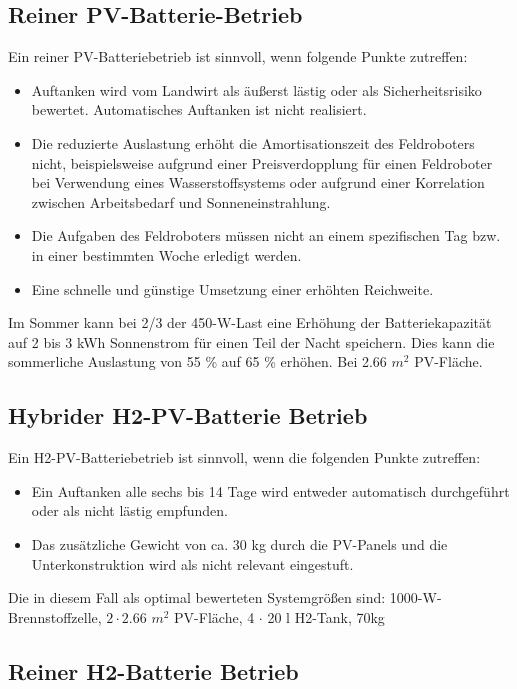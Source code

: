 \subsection{Reiner PV-Batterie-Betrieb}

Ein reiner PV-Batteriebetrieb ist sinnvoll, wenn folgende Punkte zutreffen: 
\begin{itemize}
    \item Auftanken wird vom Landwirt als äußerst lästig oder als Sicherheitsrisiko bewertet. Automatisches Auftanken ist nicht realisiert.
    \item Die reduzierte Auslastung erhöht die Amortisationszeit des Feldroboters nicht, beispielsweise aufgrund einer Preisverdopplung für einen Feldroboter bei Verwendung eines Wasserstoffsystems oder aufgrund einer Korrelation zwischen Arbeitsbedarf und Sonneneinstrahlung.
    \item Die Aufgaben des Feldroboters müssen nicht an einem spezifischen Tag bzw. in einer bestimmten Woche erledigt werden.
    \item Eine schnelle und günstige Umsetzung einer erhöhten Reichweite.
\end{itemize}
Im Sommer kann bei 2/3 der 450-W-Last eine Erhöhung der Batteriekapazität auf 2 bis 3 kWh Sonnenstrom für einen Teil der Nacht speichern. Dies kann die sommerliche Auslastung von 55 \% auf 65 \% erhöhen. Bei 2.66 $m^{2}$ PV-Fläche.\\

\subsection{Hybrider H2-PV-Batterie Betrieb}

Ein H2-PV-Batteriebetrieb ist sinnvoll, wenn die folgenden Punkte zutreffen:
\begin{itemize}
    \item Ein Auftanken alle sechs bis 14 Tage wird entweder automatisch durchgeführt oder als nicht lästig empfunden.
    \item Das zusätzliche Gewicht von ca. 30 kg durch die PV-Panels und die Unterkonstruktion wird als nicht relevant eingestuft.
\end{itemize}
Die in diesem Fall als optimal bewerteten Systemgrößen sind: 1000-W-Brennstoffzelle, $2 \cdot 2.66$ $m^{2}$ PV-Fläche, 4 $\cdot$ 20 l H2-Tank, 70kg \\

\subsection{Reiner H2-Batterie Betrieb}

